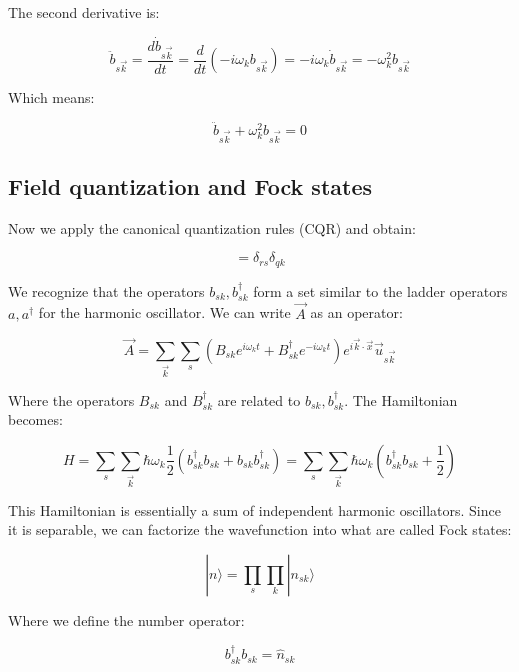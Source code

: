 \documentclass[italian]{HKNdocument}
\begin{document}
The second derivative is:

\begin{equation}
\ddot{b}_{s\vec{k}}=\frac{d\dot{b}_{s\vec{k}}}{dt}=\frac{d}{dt}(-i\omega_kb_{s\vec{k}})=-i\omega_k\dot{b}_{s\vec{k}}=-\omega_k^2b_{s\vec{k}}
\end{equation}

Which means:

\begin{equation}
\ddot{b}_{s\vec{k}}+\omega_k^2b_{s\vec{k}}=0
\end{equation}

\subsection{Field quantization and Fock states}
Now we apply the canonical quantization rules (CQR) and obtain:

\begin{equation}
[b_{sk},b_{rq}^\dagger]=\delta_{rs}\delta_{qk}
\end{equation}

We recognize that the operators $b_{sk}, b_{sk}^\dagger$ form a set similar to the ladder operators $a, a^\dagger$ for the harmonic oscillator. We can write $\vec{A}$ as an operator:

\begin{equation}
\vec{A}=\sum_{\vec{k}}\sum_s(B_{sk}e^{i\omega_k t}+B_{sk}^\dagger e^{-i\omega_k t})e^{i\vec{k}\cdot\vec{x}}\vec{u}_{s\vec{k}}
\end{equation}

Where the operators $B_{sk}$ and $B_{sk}^\dagger$ are related to $b_{sk}, b_{sk}^\dagger$. The Hamiltonian becomes:

\begin{equation}
H=\sum_s\sum_{\vec{k}}\hbar\omega_k\frac{1}{2}(b_{sk}^\dagger b_{sk}+b_{sk}b_{sk}^\dagger)=\sum_s\sum_{\vec{k}}\hbar\omega_k(b_{sk}^\dagger b_{sk}+\frac{1}{2})
\end{equation}


This Hamiltonian is essentially a sum of independent harmonic oscillators. Since it is separable, we can factorize the wavefunction into what are called Fock states:

\begin{equation}
|n\rangle=\prod_s\prod_k|n_{sk}\rangle
\end{equation}

Where we define the number operator:

\begin{equation}
b_{sk}^\dagger b_{sk}=\hat{n}_{sk}
\end{equation}
\end{document}
